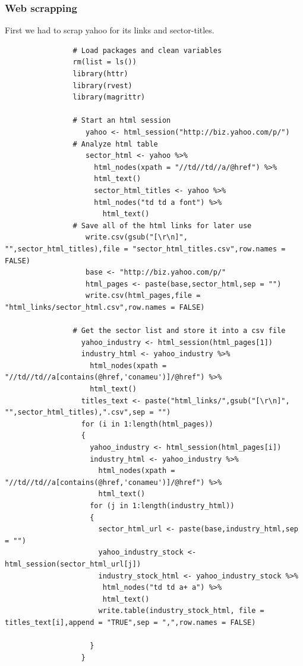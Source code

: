 \documentclass[12pt,titlepage,letter]{article}
\begin{document}
		\subsubsection{Web scrapping}
			First we had to scrap yahoo for its links and sector-titles.
			\begin{verbatim}
				# Load packages and clean variables
				rm(list = ls())
				library(httr)
				library(rvest)
				library(magrittr)

				# Start an html session
				   yahoo <- html_session("http://biz.yahoo.com/p/")
				# Analyze html table
				   sector_html <- yahoo %>%
					 html_nodes(xpath = "//td//td//a/@href") %>%
					 html_text()
					 sector_html_titles <- yahoo %>%
					 html_nodes("td td a font") %>%
					   html_text()
				# Save all of the html links for later use   
				   write.csv(gsub("[\r\n]", "",sector_html_titles),file = "sector_html_titles.csv",row.names = FALSE)
				   base <- "http://biz.yahoo.com/p/"
				   html_pages <- paste(base,sector_html,sep = "")
				   write.csv(html_pages,file = "html_links/sector_html.csv",row.names = FALSE)

				# Get the sector list and store it into a csv file   
				  yahoo_industry <- html_session(html_pages[1])
				  industry_html <- yahoo_industry %>%
				    html_nodes(xpath = "//td//td//a[contains(@href,'conameu')]/@href") %>%
				    html_text()
				  titles_text <- paste("html_links/",gsub("[\r\n]", "",sector_html_titles),".csv",sep = "")
				  for (i in 1:length(html_pages))
				  {
				    yahoo_industry <- html_session(html_pages[i])
				    industry_html <- yahoo_industry %>%
				      html_nodes(xpath = "//td//td//a[contains(@href,'conameu')]/@href") %>%
				      html_text()
				    for (j in 1:length(industry_html))
				    {
				      sector_html_url <- paste(base,industry_html,sep = "")
				      yahoo_industry_stock <- html_session(sector_html_url[j])
				      industry_stock_html <- yahoo_industry_stock %>%
				       html_nodes("td td a+ a") %>%
				       html_text()
				      write.table(industry_stock_html, file = titles_text[i],append = "TRUE",sep = ",",row.names = FALSE)
				    
				    }
				  }
			\end{verbatim}
\end{document}
